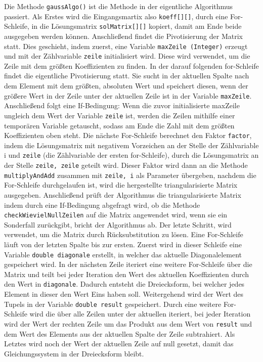 \documentclass[a4paper, 12pt]{report}
\begin{document}
\begin{sloppypar}
Die Methode \texttt{gaussAlgo()} ist die Methode in der eigentliche Algorithmus passiert.
Als Erstes wird die Eingangsmartix also \texttt{koeff[][]}, durch eine For-Schleife, in die Lösungsmatrix \texttt{solMatrix[][]} kopiert, damit am Ende
beide ausgegeben werden können.
Anschließend findet die Pivotisierung der Matrix statt. Dies geschieht, indem zuerst,
eine Variable \texttt{maxZeile (Integer)} erzeugt und mit der Zählvariable \texttt{zeile} initialisiert wird.
Diese wird verwendet, um die Zeile mit dem größten Koeffizienten zu finden.
In der darauf folgenden for-Schleife findet die eigentliche Pivotisierung statt.
Sie sucht in der aktuellen Spalte nach dem Element mit dem größten, absoluten Wert
und speichert diesen, wenn der größere Wert in der Zeile unter der aktuellen Zeile ist in der Variable \texttt{maxZeile}.
Anschließend folgt eine If-Bedingung: Wenn die zuvor initialisierte maxZeile ungleich dem Wert der Variable \texttt{zeile} ist,
werden die Zeilen mithilfe einer temporären Variable getauscht, sodass am Ende die
Zahl mit dem größten Koeffizienten oben steht.
Die nächste For-Schleife berechnet den Faktor \texttt{factor}, indem die Lösungsmatrix mit negativem Vorzeichen an der Stelle der Zählvariable i
und \texttt{zeile} (die Zählvariable der ersten for-Schleife), durch die Lösungsmatrix an der Stelle \texttt{zeile, zeile} geteilt wird.
Dieser Faktor wird dann an die Methode \texttt{multiplyAndAdd} zusammen mit \texttt{zeile, i} als Parameter übergeben, nachdem
die For-Schleife durchgelaufen ist, wird die hergestellte triangularisierte Matrix  ausgegeben. Anschließend prüft der Algorithmus
die triangularisierte Matrix indem durch eine If-Bedingung abgefragt wird, ob die Methode \texttt{checkWievielNullZeilen} auf
die Matrix angewendet wird, wenn sie ein Sonderfall zurückgibt, bricht der Algorithmus ab.
Der letzte Schritt, wird verwendet, um die Matrix durch Rücksubstitution zu lösen.
Eine For-Schleife läuft von der letzten Spalte bis zur ersten. Zuerst wird in dieser Schleife eine Variable \texttt{double diagonale}
erstellt, in welcher das aktuelle Diagonalelement gespeichert wird. In der nächsten Zeile iteriert eine weitere For-Schleife
über die Matrix und teilt bei jeder Iteration den Wert des aktuellen Koeffizienten durch den Wert in \texttt{diagonale}.
Dadurch entsteht die Dreiecksform, bei welcher jedes Element in dieser den Wert Eins haben soll.
Weitergehend wird der Wert des Tupels in der Variable \texttt{double result} gespeichert.
Durch eine weitere For-Schleife wird die über alle Zeilen unter der aktuellen iteriert, bei jeder Iteration wird der Wert
der rechten Zeile um das Produkt aus dem Wert von \texttt{result} und dem Wert des Elements aus der aktuellen Spalte der Zeile
subtrahiert. Als Letztes wird noch der Wert der aktuellen Zeile auf null gesetzt, damit das Gleichungssystem in der Dreiecksform
bleibt.






\end{sloppypar}
\end{document}
